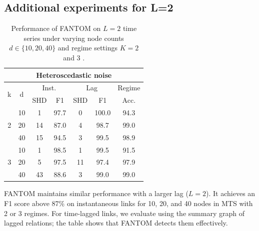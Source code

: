 \subsection{Additional experiments for L=2}
\begin{table}[H]
\centering
\caption{Performance of FANTOM on $L=2$ time series under varying node counts $d \in \{1 0 , 2 0 , 4 0\}$ and regime settings $K =2$ and $3$ .}
\begin{tabular}{@{}ccccccc@{}}
\toprule
\multicolumn{7}{c}{Heteroscedastic noise}                                                                                                                       \\ \midrule
\multicolumn{1}{c|}{\multirow{2}{*}{k}} & \multicolumn{1}{c|}{\multirow{2}{*}{d}} & \multicolumn{2}{c|}{Inst.}      & \multicolumn{2}{c|}{Lag}         & Regime \\ \cmidrule(l){3-7} 
\multicolumn{1}{c|}{}                   & \multicolumn{1}{c|}{}                   & SHD & \multicolumn{1}{c|}{F1}   & SHD & \multicolumn{1}{c|}{F1}    & Acc.   \\ \midrule
\multicolumn{1}{c|}{\multirow{3}{*}{2}} & \multicolumn{1}{c|}{10}                 & 1   & \multicolumn{1}{c|}{97.7} & 0   & \multicolumn{1}{c|}{100.0} & 94.3   \\
\multicolumn{1}{c|}{}                   & \multicolumn{1}{c|}{20}                 & 14  & \multicolumn{1}{c|}{87.0} & 4   & \multicolumn{1}{c|}{98.7}  & 99.0   \\
\multicolumn{1}{c|}{}                   & \multicolumn{1}{c|}{40}                 & 15  & \multicolumn{1}{c|}{94.5} & 3   & \multicolumn{1}{c|}{99.5}  & 98.9   \\ \midrule
\multicolumn{1}{c|}{\multirow{3}{*}{3}} & \multicolumn{1}{c|}{10}                 & 1   & \multicolumn{1}{c|}{98.5} & 1   & \multicolumn{1}{c|}{99.5}  & 91.5   \\
\multicolumn{1}{c|}{}                   & \multicolumn{1}{c|}{20}                 & 5   & \multicolumn{1}{c|}{97.5} & 11  & \multicolumn{1}{c|}{97.4}  & 97.9   \\
\multicolumn{1}{c|}{}                   & \multicolumn{1}{c|}{40}                 & 43  & \multicolumn{1}{c|}{88.6} & 3   & \multicolumn{1}{c|}{99.0}  & 99.0   \\ \bottomrule
\end{tabular}
\end{table}

FANTOM maintains similar performance with a larger lag ($L=2$). It achieves an F1 score above 87\% on instantaneous links for 10, 20, and 40 nodes in MTS with 2 or 3 regimes. For time‑lagged links, we evaluate using the summary graph of lagged relations; the table shows that FANTOM detects them effectively.